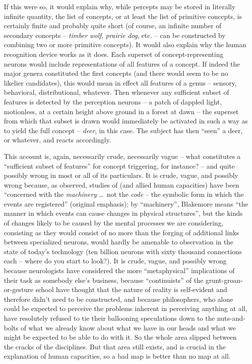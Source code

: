 If this were so, it would explain why, while percepts may be stored in literally infinite quantity, the list of concepts, or at least the list of primitive concepts, is certainly finite and probably quite short (of course, an infinite number of secondary concepts -- \textit{timber wolf}, \textit{prairie dog}, etc. -- can be constructed by combining two or more primitive concepts). It would also explain why the human recognition device works as it does. Each superset of concept-representing neurons would include representations of all features of a concept. If indeed the major genera constituted the first concepts (and there would seem to be no likelier candidates), this would mean in effect all features of a genus -- sensory, behavioral, distributional, whatever. Then whenever any sufficient subset of features is detected by the perception neurons --
a patch of dappled light, motionless, at a certain height above ground in a forest at dawn -- the superset from which that subset is drawn would immediately be activated in such a way as to yield the full concept -- \textit{deer}, in this case. The subject has then ``seen'' a deer, or whatever, and reacts accordingly.

This account is, again, necessarily crude, necessarily vague -- what constitutes a ``sufficient subset of features'' for concept triggering, for instance? -- and quite possibly wrong in most or all of its particulars. It is crude, vague, and possibly wrong because, as \citet{Blakemore1977} observed, studies of  (and allied human capacities) have been ``concerned with the \textit{machinery} \ldots~not the \textit{code} -- the symbolic form in which the events are registered'' (original emphasis); by ``machinery'', Blakemore means ``the manner in which events can cause changes in physical structures'', but the kinds of changes likely to be caused by the mental processes we are considering, consisting as they would consist of no more than the forging of additional links between specialized neurons, would hardly be amenable to observation in the state of today's technology (ten billion neurons with sixty thousand connections each -- where do you start to look?). It is crude, vague, and possibly wrong because neurologists have considered the more ``metaphysical'' implications of their task as somebody else's business, because ``continuists'' of the grunt-groan-or-gesture school have thought that the nature of reality is self-evident and therefore didn't need to be constructed, and because philosophers, who alone could be expected to perceive the problems inherent in perceiving anything at all, have resolutely refused to tie their ballooning speculations down to the nuts-and-bolts of what we already know about what we have in our heads and what we might be expected to be able to do with it. So the whole area slipped between the cracks of the disciplines. But that area still exists, and is crucial in the explanation of human capacities, so a bad map is better than no map at all.\\\\


